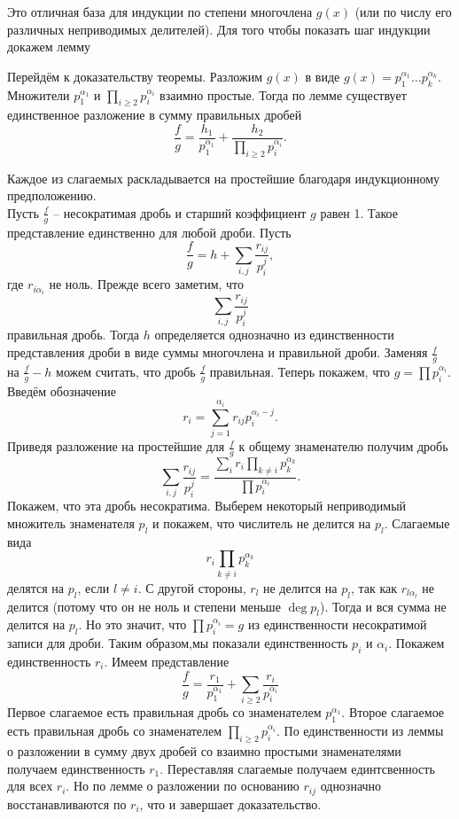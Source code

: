 Это отличная база для индукции по степени многочлена $g(x)$  (или по числу его различных неприводимых делителей). Для того чтобы показать шаг индукции докажем лемму



Перейдём к доказательству теоремы. Разложим $g(x)$ в виде $g(x)=p_1^{\alpha_1}\dots p_k^{\alpha_k}$. Множители $p_1^{\alpha_1}$ и $\prod_{i\geq 2}p_i^{\alpha_i}$ взаимно простые. Тогда по лемме существует единственное разложение в сумму правильных дробей $$\frac{f}{g}=  \frac{h_1}{p_1^{\alpha_1}}+\frac{h_2}{\prod_{i\geq 2}p_i^{\alpha_i}}.$$

Каждое из слагаемых раскладывается на простейшие благодаря индукционному предположению.\\

\proof[Единственность] Пусть $\frac{f}{g}$ -- несократимая дробь и старший коэффициент $g$ равен 1. Такое представление единственно для любой дроби. Пусть
$$\frac{f}{g}=h+\sum_{i,j} \frac{r_{ij}}{p_i^{j}},$$
где $r_{i\alpha_i}$ не ноль. Прежде всего заметим, что $$\sum_{i,j} \frac{r_{ij}}{p_i^{j}}$$
правильная дробь. Тогда $h$ определяется однозначно из единственности представления дроби в виде суммы многочлена и правильной дроби. Заменяя $\frac{f}{g}$ на $\frac{f}{g}-h$ можем считать, что дробь $\frac{f}{g}$ правильная. Теперь  покажем, что  $g=\prod p_i^{\alpha_i}$. Введём обозначение $$r_i= \sum_{j=1}^{\alpha_i} r_{ij} p_i^{\alpha_i-j}.$$
Приведя разложение на простейшие для $\frac{f}{g}$ к общему знаменателю  получим дробь 
$$\sum_{i,j} \frac{r_{ij}}{p_i^{j}}= \frac{\sum_{i} r_{i}\prod_{k\neq i} p_k^{\alpha_{k}}}{\prod p_i^{\alpha_{i}}}.$$
Покажем, что эта дробь несократима. Выберем некоторый неприводимый множитель знаменателя $p_l$ и покажем, что числитель не делится на $p_l$. Слагаемые вида $$r_i \prod_{k\neq i} p_k^{\alpha_{k}}$$ делятся на $p_l$, если $l \neq i$. С другой стороны, $r_l$ не делится на $p_l$, так как $r_{l\alpha_l}$ не делится (потому что он не ноль и степени меньше $\deg p_l$). Тогда и вся сумма не делится на $p_l$.
Но это значит, что $\prod p_i^{\alpha_i}=g$ из единственности несократимой записи для дроби. Таким образом,мы показали единственность $p_i$  и $\alpha_i$. Покажем единственность $r_i$. Имеем представление $$\frac{f}{g}=\frac{r_1}{p_1^{\alpha_1}}+\sum_{i\geq 2} \frac{r_i}{p_i^{\alpha_i}}$$
Первое слагаемое есть правильная дробь со знаменателем $p_1^{\alpha_1}$. Второе слагаемое есть правильная дробь со знаменателем $\prod_{i\geq 2}p_i^{\alpha_i}$. По единственности из леммы о разложении в сумму двух дробей со взаимно простыми знаменателями получаем единственность $r_1$. Переставляя слагаемые получаем единтсвенность для всех $r_i$. Но по лемме о разложении по основанию $r_{ij}$ однозначно восстанавливаются по $r_i$, что и завершает доказательство.
\endproof

